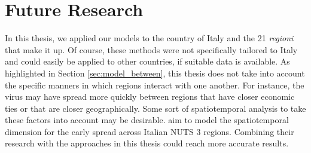 \documentclass[12pt]{article}
\begin{document}
	
	\section{Future Research} \label{sec:future_research}
	
	In this thesis, we applied our models to the country of Italy and the 21 \textit{regioni} that make it up. Of course, these methods were not specifically tailored to Italy and could easily be applied to other countries, if suitable data is available. As highlighted in Section \ref{sec:model_between}, this thesis does not take into account the specific manners in which regions interact with one another. For instance, the virus may have spread more quickly between regions that have closer economic ties or that are closer geographically. Some sort of spatiotemporal analysis to take these factors into account may be desirable. \textcite{giuliani2020modelling} aim to model the spatiotemporal dimension for the early spread across Italian NUTS 3 regions. Combining their research with the approaches in this thesis could reach more accurate results. %
	\\
	
\end{document}
